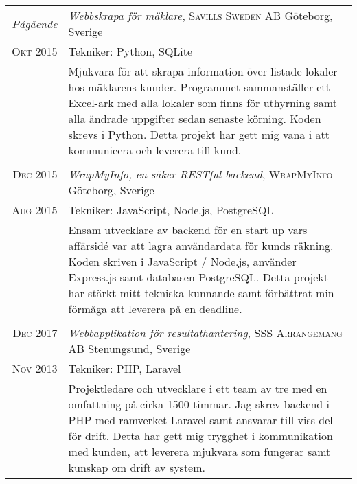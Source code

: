 \documentclass[a4paper,10pt]{scrartcl} %
\begin{document}
\begin{tabular}{r|p{15cm}}

\emph{Pågående} 	                & \emph{Webbskrapa för mäklare}, \textsc{Savills Sweden AB} \hfill Göteborg, Sverige \\
\textsc{Okt 2015}                   & \footnotesize{Tekniker: Python, SQLite} \\
\phantom{abcdefghijklm}             & \footnotesize{Mjukvara för att skrapa information över listade lokaler hos mäklarens kunder. Programmet sammanställer ett Excel-ark med alla lokaler som finns för uthyrning samt alla ändrade uppgifter sedan senaste körning. Koden skrevs i Python. Detta projekt har gett mig vana i att kommunicera och leverera till kund.}\\
\multicolumn{2}{c}{} \\


\textsc{Dec 2015} |	                & \emph{WrapMyInfo, en säker RESTful backend}, \textsc{WrapMyInfo} \hfill Göteborg, Sverige \\
\textsc{Aug 2015} 	                & \footnotesize{Tekniker: JavaScript, Node.js, PostgreSQL} \\
					                & \footnotesize{Ensam utvecklare av backend för en start up vars affärsidé var att lagra användardata för kunds räkning. Koden skriven i JavaScript / Node.js, använder Express.js samt databasen PostgreSQL. Detta projekt har stärkt mitt tekniska kunnande samt förbättrat min förmåga att leverera på en deadline.}\\
\multicolumn{2}{c}{} \\


\textsc{Dec 2017} |  	            & \emph{Webbapplikation för resultathantering}, \textsc{SSS Arrangemang AB} \hfill Stenungsund, Sverige \\
\textsc{Nov 2013}                   & \footnotesize{Tekniker: PHP, Laravel} \\
					                & \footnotesize{Projektledare och utvecklare i ett team av tre med en omfattning på cirka 1500 timmar. Jag skrev backend i PHP med ramverket Laravel samt ansvarar till viss del för drift. Detta har gett mig trygghet i kommunikation med kunden, att leverera mjukvara som fungerar samt kunskap om drift av system.}\\
\end{tabular}
\end{document}
